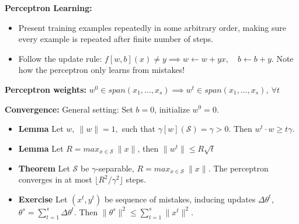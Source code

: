 \textbf{Perceptron Learning:} 
\begin{itemize}
    \item Present training examples repeatedly in some arbitrary order, making sure every example is repeated after finite number of steps.
    \item Follow the update rule: $f[w, b](x) \neq y \implies w\leftarrow w + yx, \quad b \leftarrow b + y$. Note how the perceptron only learns from mistakes!
\end{itemize}  


\textbf{Perceptron weights:} $w^0 \in span(x_1, \dots, x_s) \implies w^t \in span(x_1, \dots, x_s), \ \forall t $


\textbf{Convergence:} General setting: Set $b=0$, initialize $w^0=0$. 
\begin{itemize}
    \item \textbf{Lemma} Let $w, \ \lVert w\rVert = 1,$ such that $\gamma[w](\mathcal{S}) = \gamma > 0$. Then $w^t \cdot w \geq t\gamma$. 
    \item \textbf{Lemma} Let $R =max_{x\in \mathcal{S}}\ \lVert x\rVert$, then $\lVert w^t \rVert \leq R \sqrt{t}$
    \item \textbf{Theorem} Let $\mathcal{S}$ be $\gamma$-separable, $R = max_{x \in \mathcal{S}}\ \lVert x\rVert$. The perceptron converges in at most $\lfloor R^2 / \gamma ^2\rfloor$ steps.
    \item \textbf{Exercise} Let $(x^t, y^t)$ be sequence of mistakes, inducing updates $\Delta\theta^t$, $\theta^s=\sum_{t = 1}^s \Delta\theta^t$. Then $\lVert\theta^s\lVert^2 \leq\sum_{t =1}^s \lVert x^t\rVert^2$.
\end{itemize}



